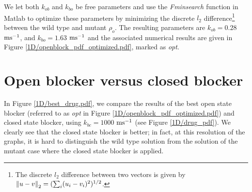 We let both $k_{ob}$ and $k_{bo}$ be free parameters and use the {\it Fminsearch \label{Fminsearch}} function in Matlab to optimize these parameters by minimizing the discrete $l_2$ difference\footnote{The discrete $l_2$ difference between two vectors is given by
$\left\|u-v\right\|_2=(\sum_i (u_i-v_i)^2)^{1/2}$.} between the wild type and mutant $\rho_o$. 
The resulting parameters are $k_{ob}=0.28$ $\rm{ms^{-1}}$, and $k_{bo}=1.63$ $\rm{ms^{-1}}$
and the associated numerical results are given in Figure \ref{1D/openblock_pdf_optimized.pdf}, marked as {\it opt}.

\section{Open blocker versus closed blocker}
In Figure  \ref{1D/best_drug.pdf}, we compare the results of the best open state blocker 
(referred to as {\it opt} in Figure  \ref{1D/openblock_pdf_optimized.pdf}) and closed state blocker, using $k_{bc}=1000$ $\rm{ms^{-1}}$ (see Figure
\ref{1D/drug_pdf}). We clearly see that the closed state blocker is better; in fact, at this resolution of the graphs, it is hard to distinguish the wild type solution from the solution of the mutant case where the closed state blocker is applied.


